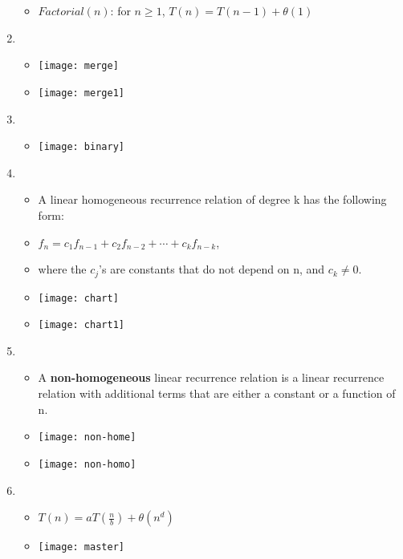\documentclass[12pt,a4paper]{article}
\begin{document}
\begin{enumerate}
\begin{itemize}
    \item \(Factorial(n)\): for \(n \geq 1\), \(T(n) = T(n-1) + \theta (1)\) 
  \end{itemize}
  \clearpage
  \item {}
  \begin{itemize}
    \item[] \texttt{[image: merge]}
    \item[] \texttt{[image: merge1]}  
  \end{itemize}
  \clearpage
  \item {}
  \begin{itemize}
    \item[] \texttt{[image: binary]} 
  \end{itemize}
  \item {}
  \begin{itemize}
    \item A linear homogeneous recurrence relation of degree k has the following form:
    \item[] \(f_n = c_1 f_{n-1} + c_2 f_{n-2} + \cdots + c_k f_{n-k} \), 
    \item[] where the \(c_j\)'s are constants that do not depend on n, and \(c_k \neq 0\). 
    \item[] \texttt{[image: chart]} 
    \item[] \texttt{[image: chart1]} 
  \end{itemize}
  \clearpage
  \item {}
  \begin{itemize}
    \item A \textbf{non-homogeneous} linear recurrence relation is a linear recurrence relation with additional terms that are either a constant or a function of n. 
    \item[] \texttt{[image: non-home]} 
    \item[] \texttt{[image: non-homo]} 
  \end{itemize}
  \item {}
  \begin{itemize}
    \item \(T(n) = aT(\frac{n}{b}) + \theta (n^d)\)
    \item[] \texttt{[image: master]}
  \end{itemize}
\end{enumerate}
\end{document}
